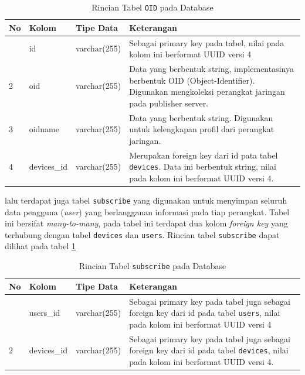     	\begin{longtable}{|p{}|p{}|p{}|p{}|} %
    		
    		\caption{Rincian Tabel \texttt{OID} pada Database} \label{tabeldboid} \\
    		\hline
    		\textbf{No} & \textbf{Kolom} & \textbf{Tipe Data} & \textbf{Keterangan} \\ \hline
    		\endhead
    		\endfoot
    		\endlastfoot
    		1 & id & varchar(255) & Sebagai primary key pada tabel, nilai pada kolom ini berformat UUID versi 4 \\ \hline
    		2 & oid & varchar(255) & Data yang berbentuk string, implementasinya berbentuk OID (Object-Identifier). Digunakan mengkoleksi perangkat jaringan pada publisher server. \\ \hline
    		3 & oidname & varchar(255) & Data yang berbentuk string. Digunakan untuk kelengkapan profil dari perangkat jaringan. \\ \hline
    		4 & devices\_id & varchar(255) & Merupakan foreign key dari id pata tabel \texttt{devices}. Data ini berbentuk string, nilai pada kolom ini berformat UUID versi 4. \\ \hline
    	\end{longtable}
    
    	lalu terdapat juga tabel \texttt{subscribe} yang digunakan untuk menyimpan seluruh data pengguna (\textit{user}) yang berlangganan informasi pada tiap perangkat. Tabel ini bersifat \textit{many-to-many}, pada tabel ini terdapat dua kolom \textit{foreign key} yang terhubung dengan tabel \texttt{devices} dan \texttt{users}. Rincian tabel \texttt{subscribe} dapat dilihat pada tabel \ref{tabeldboid}
    
    	\begin{longtable}{|p{}|p{}|p{}|p{}|} %
    		
    		\caption{Rincian Tabel \texttt{subscribe} pada Database} \label{tabeldbsubscribe} \\
    		\hline
    		\textbf{No} & \textbf{Kolom} & \textbf{Tipe Data} & \textbf{Keterangan} \\ \hline
    		\endhead
    		\endfoot
    		\endlastfoot
    		1 & users\_id & varchar(255) & Sebagai primary key pada tabel juga sebagai foreign key dari id pada tabel \texttt{users}, nilai pada kolom ini berformat UUID versi 4 \\ \hline
    		2 & devices\_id & varchar(255) & Sebagai primary key pada tabel juga sebagai foreign key dari id pada tabel \texttt{devices}, nilai pada kolom ini berformat UUID versi 4. \\ \hline
    	\end{longtable}
    	
